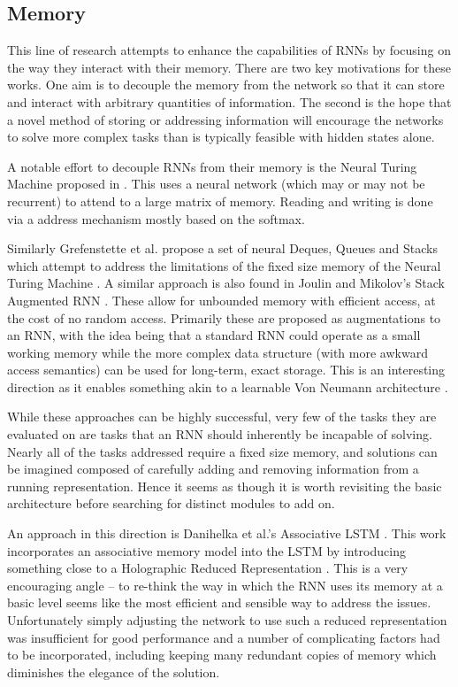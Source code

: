 \subsection{Memory}
This line of research attempts to enhance the capabilities of RNNs by focusing on the way they
interact with their memory. There are two key motivations for these works. 
One aim is to decouple the memory from the network so that it can store and interact with arbitrary
quantities of information. The second is the hope that a novel
method of storing or addressing information will encourage the networks to solve more complex
tasks than is typically feasible with hidden states alone.

A notable effort to decouple RNNs from their memory is the Neural Turing Machine proposed in
\autocite{Graves2014}. This uses a neural network (which may or may not be recurrent) to
attend to a large matrix of memory. Reading and writing is done via a
address mechanism mostly based on the softmax.

Similarly Grefenstette et al. propose a set of neural Deques, Queues and Stacks which attempt to
address the limitations of the fixed size memory of the Neural Turing Machine 
\autocite{Grefenstette2015}. A similar approach is also found in Joulin and Mikolov's Stack Augmented
RNN \autocite{Joulin2015}. These allow for unbounded memory with efficient access, at the cost of
no random access. Primarily these are proposed as augmentations to an RNN,
with the idea being that a standard RNN could operate as a small working memory while the more
complex data structure (with more awkward access semantics) can be used for long-term, exact
storage. This is an interesting direction as it enables something akin to a learnable Von Neumann
architecture \autocite{Graves2014}.

While these approaches can be highly successful, very few of the tasks 
they are evaluated on are tasks that an RNN should inherently be
incapable of solving. Nearly all of the tasks addressed require a fixed size memory, and solutions
can be imagined composed of carefully adding and removing information from a running representation.
Hence it seems as though it is worth revisiting the basic architecture before searching for distinct 
modules to add on.

An approach in this direction is Danihelka et al.'s Associative LSTM \autocite{Danihelka2016}. 
This work incorporates an associative memory model into the LSTM by introducing
 something close to a Holographic Reduced Representation \autocite{Plate1995}.
This is a very encouraging angle -- to re-think the way in which the RNN uses its memory at a basic
level seems like the most efficient and sensible way to address the issues.
Unfortunately simply adjusting the network to use such a reduced representation was insufficient for
good performance and a number of complicating factors had to be incorporated, including keeping many
redundant copies of memory which diminishes the elegance of the solution.

